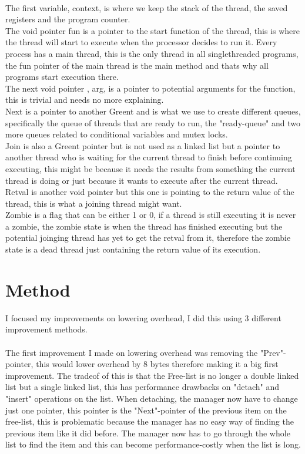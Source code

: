 \documentclass[11pt]{article}
\begin{document}
\paragraph{}
The first variable, context, is where we keep the stack of the thread, the saved registers and the program counter. \\
The void pointer fun is a pointer 
to the start function of the thread, this is where the thread will start to execute when the processor decides to run it. Every process has a main thread,
this is the only thread in all singlethreaded programs, the fun pointer of the main thread is the main method and thats why all programs start execution
there. \\
The next void pointer , arg, is a pointer to potential arguments for the function, this is trivial and needs no more explaining. \\
Next is a pointer to another Green\textunderscore t and is what we use to create different queues, specifically the queue of threads that are ready 
to run, the "ready-queue" and two more queues related to conditional variables and mutex locks. \\
Join is also a Green\textunderscore t pointer but is not used as a linked list but a pointer to another thread who is waiting for the current thread
to finish before continuing executing, this might be because it needs the results from something the current thread is doing or just because 
it wants to execute after the current thread. \\
Retval is another void pointer but this one is pointing to the return value of the thread, this is what a joining thread might want. \\
Zombie is a flag that can be either 1 or 0, if a thread is still executing it is never a zombie, the zombie state is when the thread has finished
executing but the potential joinging thread has yet to get the retval from it, therefore the zombie state is a dead thread just 
containing the return value of its execution.

\section{Method}

I focused my improvements on lowering overhead, I did this using 3 different improvement methods.

\paragraph{}
The first improvement I made on lowering overhead was removing the "Prev"-pointer, this would lower overhead by 8 bytes therefore making it a big
first improvement. The tradeof of this is that the Free-list is no longer a double linked list but a single linked list, this has performance
drawbacks on "detach" and "insert" operations on the list. When detaching, the manager now have to change just one pointer, this pointer is the 
"Next"-pointer of the previous item on the free-list, this is problematic because the manager has no easy way of finding the previous item like
it did before. The manager now has to go through the whole list to find the item and this can become performance-costly when the list is long.
\end{document}
